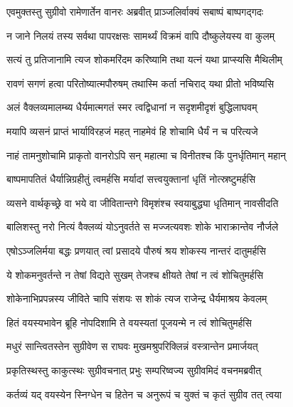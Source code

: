 
\twolineshloka
{एवमुक्तस्तु सुग्रीवो रामेणार्तेन वानरः}
{अब्रवीत् प्राञ्जलिर्वाक्यं सबाष्पं बाष्पगद्गदः} %

\twolineshloka
{न जाने निलयं तस्य सर्वथा पापरक्षसः}
{सामर्थ्यं विक्रमं वापि दौष्कुलेयस्य वा कुलम्} %

\twolineshloka
{सत्यं तु प्रतिजानामि त्यज शोकमरिंदम}
{करिष्यामि तथा यत्नं यथा प्राप्स्यसि मैथिलीम्} %

\twolineshloka
{रावणं सगणं हत्वा परितोष्यात्मपौरुषम्}
{तथास्मि कर्ता नचिराद् यथा प्रीतो भविष्यसि} %

\twolineshloka
{अलं वैक्लव्यमालम्ब्य धैर्यमात्मगतं स्मर}
{त्वद्विधानां न सदृशमीदृशं बुद्धिलाघवम्} %

\twolineshloka
{मयापि व्यसनं प्राप्तं भार्याविरहजं महत्}
{नाहमेवं हि शोचामि धैर्यं न च परित्यजे} %

\twolineshloka
{नाहं तामनुशोचामि प्राकृतो वानरोऽपि सन्}
{महात्मा च विनीतश्च किं पुनर्धृतिमान् महान्} %

\twolineshloka
{बाष्पमापतितं धैर्यान्निग्रहीतुं त्वमर्हसि}
{मर्यादां सत्त्वयुक्तानां धृतिं नोत्स्रष्टुमर्हसि} %

\twolineshloka
{व्यसने वार्थकृच्छ्रे वा भये वा जीवितान्तगे}
{विमृशंश्च स्वयाबुद्ध्या धृतिमान् नावसीदति} %

\twolineshloka
{बालिशस्तु नरो नित्यं वैक्लव्यं योऽनुवर्तते}
{स मज्जत्यवशः शोके भाराक्रान्तेव नौर्जले} %

\twolineshloka
{एषोऽञ्जलिर्मया बद्धः प्रणयात् त्वां प्रसादये}
{पौरुषं श्रय शोकस्य नान्तरं दातुमर्हसि} %

\twolineshloka
{ये शोकमनुवर्तन्ते न तेषां विद्यते सुखम्}
{तेजश्च क्षीयते तेषां न त्वं शोचितुमर्हसि} %

\twolineshloka
{शोकेनाभिप्रपन्नस्य जीविते चापि संशयः}
{स शोकं त्यज राजेन्द्र धैर्यमाश्रय केवलम्} %

\twolineshloka
{हितं वयस्यभावेन ब्रूहि नोपदिशामि ते}
{वयस्यतां पूजयन्मे न त्वं शोचितुमर्हसि} %

\twolineshloka
{मधुरं सान्त्वितस्तेन सुग्रीवेण स राघवः}
{मुखमश्रुपरिक्लिन्नं वस्त्रान्तेन प्रमार्जयत्} %

\twolineshloka
{प्रकृतिस्थस्तु काकुत्स्थः सुग्रीवचनात् प्रभुः}
{सम्परिष्वज्य सुग्रीवमिदं वचनमब्रवीत्} %

\twolineshloka
{कर्तव्यं यद् वयस्येन स्निग्धेन च हितेन च}
{अनुरूपं च युक्तं च कृतं सुग्रीव तत् त्वया} %

